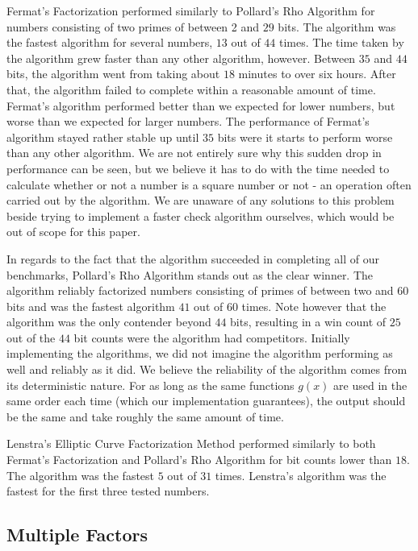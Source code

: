 Fermat's Factorization performed similarly to Pollard's Rho Algorithm for numbers consisting of two primes of between 2 and $29$ bits. The algorithm was the fastest algorithm for several numbers, $13$ out of $44$ times. The time taken by the algorithm grew faster than any other algorithm, however. Between $35$ and $44$ bits, the algorithm went from taking about $18$ minutes to over six hours. After that, the algorithm failed to complete within a reasonable amount of time. Fermat's algorithm performed better than we expected for lower numbers, but worse than we expected for larger numbers. The performance of Fermat's algorithm stayed rather stable up until $35$ bits were it starts to perform worse than any other algorithm. We are not entirely sure why this sudden drop in performance can be seen, but we believe it has to do with the time needed to calculate whether or not a number is a square number or not - an operation often carried out by the algorithm. We are unaware of any solutions to this problem beside trying to implement a faster check algorithm ourselves, which would be out of scope for this paper.

In regards to the fact that the algorithm succeeded in completing all of our benchmarks, Pollard's Rho Algorithm stands out as the clear winner. The algorithm reliably factorized numbers consisting of primes of between two and $60$ bits and was the fastest algorithm $41$ out of $60$ times. Note however that the algorithm was the only contender beyond $44$ bits, resulting in a win count of $25$ out of the $44$ bit counts were the algorithm had competitors. Initially implementing the algorithms, we did not imagine the algorithm performing as well and reliably as it did. We believe the reliability of the algorithm comes from its deterministic nature. For as long as the same functions $g(x)$ are used in the same order each time (which our implementation guarantees), the output should be the same and take roughly the same amount of time.

Lenstra's Elliptic Curve Factorization Method performed similarly to both Fermat's Factorization and Pollard's Rho Algorithm for bit counts lower than $18$. The algorithm was the fastest $5$ out of $31$ times. Lenstra's algorithm was the fastest for the first three tested numbers.

\subsection{Multiple Factors}

